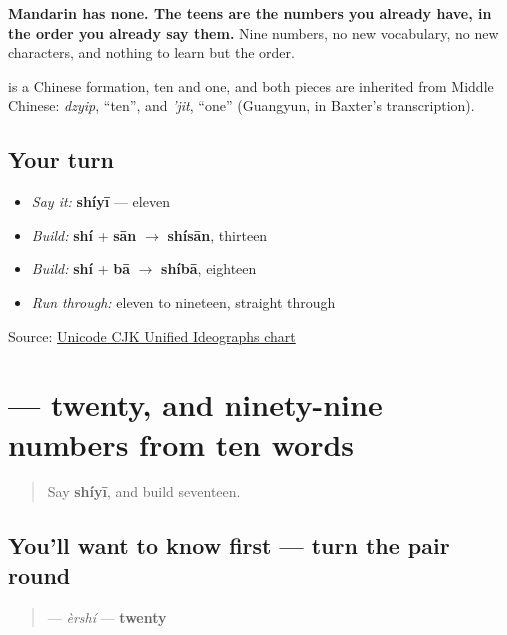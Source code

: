 \textbf{Mandarin has none. The teens are the numbers you already have, in the order you already say them.} Nine numbers, no new vocabulary, no new characters, and nothing to learn but the order.

\begin{cousinweb}
\textbf{} is a Chinese formation, ten and one, and both pieces are inherited from Middle Chinese: \emph{dzyip}, \textquotedblleft{}ten\textquotedblright{}, and \emph{'jit}, \textquotedblleft{}one\textquotedblright{} (Guangyun, in Baxter's transcription).
\end{cousinweb}

\subsection*{Your turn}
\begin{itemize}
\raggedright
  \item \emph{Say it:} \textbf{shíyī} — eleven
  \item \emph{Build:} \textbf{shí} + \textbf{sān} $\to$ \textbf{shísān}, thirteen
  \item \emph{Build:} \textbf{shí} + \textbf{bā} $\to$ \textbf{shíbā}, eighteen
  \item \emph{Run through:} eleven to nineteen, straight through
\end{itemize}

\begin{tcolorbox}[breakable,colback=teal!4,colframe=teal!35!black,title={Before you move on}]
Source: \href{https://www.unicode.org/charts/PDF/U4E00.pdf}{Unicode CJK Unified Ideographs chart}
\end{tcolorbox}
\section[\texorpdfstring{\zh{二十} (èrshí)}{二十 (èrshí)}]{ — twenty, and ninety-nine numbers from ten words}

\label{lesson:ZH-C21-ershi}



\begin{quote}
Say \textbf{shíyī}, and build seventeen.
\end{quote}

\subsection*{You'll want to know first — turn the pair round}
\begin{quote}
\textbf{} — \emph{èrshí} — \textbf{twenty}
\end{quote}

